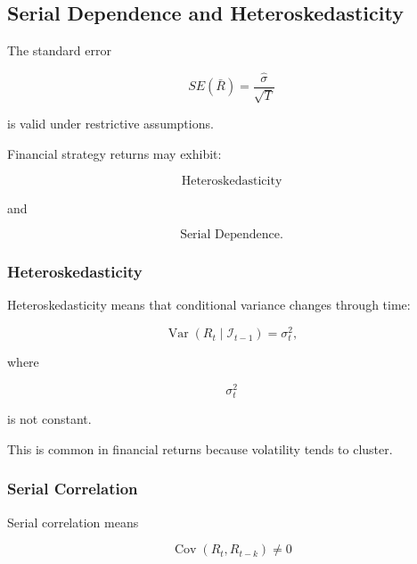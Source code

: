 \documentclass[11pt,a4paper]{article}
\begin{document}
\subsection{Serial Dependence and Heteroskedasticity}
\label{subsec:serial_dependence_heteroskedasticity}

The standard error

\begin{equation}
SE(\bar{R})
=
\frac{
\widehat{\sigma}
}{
\sqrt{T}
}
\end{equation}

is valid under restrictive assumptions.

Financial strategy returns may exhibit:

\begin{equation}
\boxed{
\text{Heteroskedasticity}
}
\end{equation}

and

\begin{equation}
\boxed{
\text{Serial Dependence}.
}
\end{equation}


\subsubsection{Heteroskedasticity}

Heteroskedasticity means that conditional variance changes through time:

\begin{equation}
\operatorname{Var}
\left(
R_t
\mid
\mathcal{I}_{t-1}
\right)
=
\sigma_t^2,
\end{equation}

where

\begin{equation}
\sigma_t^2
\end{equation}

is not constant.

This is common in financial returns because volatility tends to cluster.


\subsubsection{Serial Correlation}

Serial correlation means

\begin{equation}
\boxed{
\operatorname{Cov}
\left(
R_t,
R_{t-k}
\right)
\neq
0
}
\end{equation}
\end{document}
